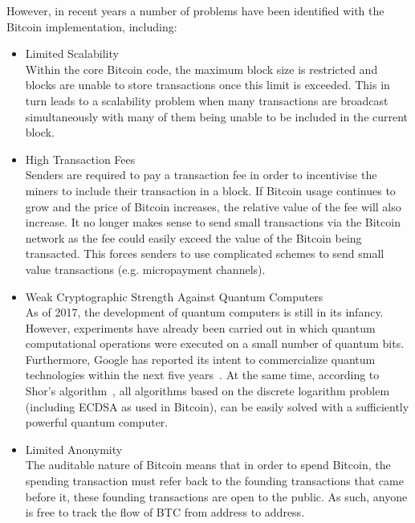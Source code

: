 \documentclass[a4paper,10pt,twocolumn]{article}
\begin{document}
However, in recent years a number of problems have been identified with the Bitcoin implementation, including:
\vspace{-0.5\baselineskip}
\begin{itemize}
	\setlength\itemsep{0em}
	\item{Limited Scalability}\mbox{}\\ 
	Within the core Bitcoin code, the maximum block size is restricted and blocks are unable to store transactions once this limit 
	is exceeded. This in turn leads to a scalability problem when many transactions are broadcast simultaneously with many of them 
	being unable to be included in the current block.
	\item{High Transaction Fees}\mbox{}\\ 
	Senders are required to pay a transaction fee in order to incentivise the miners to include their transaction in a block.
	If Bitcoin usage continues to grow and the price of Bitcoin increases, the relative value of the fee will also increase.
	It no longer makes sense to send small transactions via the Bitcoin network
	as the fee could easily exceed the value of the Bitcoin being transacted. This forces senders to use complicated schemes to send small value transactions (e.g. 
	micropayment channels).
	\item{Weak Cryptographic Strength Against Quantum Computers}\\ 
	As of 2017, the development of quantum computers is still in its infancy. However, experiments have already been carried out in 
	which quantum computational operations were executed on a small number of quantum bits. Furthermore, Google has reported its 
	intent to commercialize quantum technologies within the next five years~\cite{google}. At the same time, according to Shor's 
	algorithm~\cite{shor}, all algorithms based on the discrete logarithm problem (including ECDSA as used in 
	Bitcoin), can be easily solved with a sufficiently powerful quantum computer. 
	\item{Limited Anonymity}\mbox{}\\ 
	The auditable nature of Bitcoin means that in order to spend Bitcoin, the spending transaction must refer back to the founding
	transactions that came before it, these founding transactions are open to the public. As such, anyone is free to track the flow
	of BTC from address to address.
\end{itemize}
\end{document}
